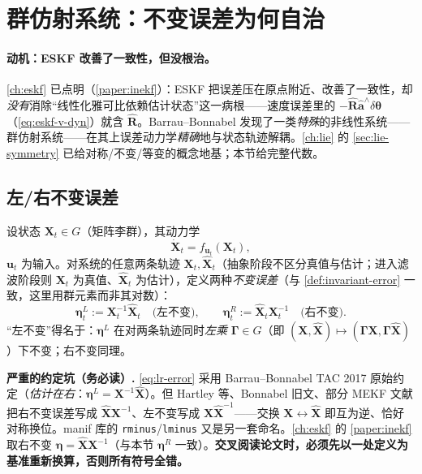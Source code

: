 \section{群仿射系统：不变误差为何自治}
\label{sec:group-affine}

\paragraph{动机：ESKF 改善了一致性，但没根治。}
\cref{ch:eskf} 已点明（\cref{paper:inekf}）：ESKF 把误差压在原点附近、改善了一致性，却\emph{没有}消除“线性化雅可比依赖估计状态”这一病根——速度误差里的 $-\hat{\mathbf{R}}\hat{\mathbf{a}}^\wedge\delta\boldsymbol{\theta}$（\cref{eq:eskf-v-dyn}）就含 $\hat{\mathbf{R}}$。Barrau--Bonnabel\cite{barrau2017invariant} 发现了一类\emph{特殊}的非线性系统——群仿射系统——在其上误差动力学\emph{精确}地与状态轨迹解耦。\cref{ch:lie} 的 \cref{sec:lie-symmetry} 已给对称/不变/等变的概念地基；本节给完整代数。

\subsection{左/右不变误差}
\label{subsec:invariant-error}

设状态 $\mathbf{X}_t\in G$（矩阵李群），其动力学
\begin{equation}
  \dot{\mathbf{X}}_t=f_{\mathbf{u}_t}(\mathbf{X}_t),
  \label{eq:ga-dynamics}
\end{equation}
$\mathbf{u}_t$ 为输入。对系统的任意两条轨迹 $\mathbf{X}_t,\hat{\mathbf{X}}_t$（抽象阶段不区分真值与估计；进入滤波阶段则 $\mathbf{X}_t$ 为真值、$\hat{\mathbf{X}}_t$ 为估计），定义两种\emph{不变误差}（与 \cref{def:invariant-error} 一致，这里用群元素而非其对数）：
\begin{equation}
  \boldsymbol{\eta}^L_t:=\mathbf{X}_t^{-1}\hat{\mathbf{X}}_t\quad\text{(左不变)},\qquad
  \boldsymbol{\eta}^R_t:=\hat{\mathbf{X}}_t\mathbf{X}_t^{-1}\quad\text{(右不变)}.
  \label{eq:lr-error}
\end{equation}
“左不变”得名于：$\boldsymbol{\eta}^L$ 在对两条轨迹同时\emph{左乘} $\boldsymbol{\Gamma}\in G$（即 $(\mathbf{X},\hat{\mathbf{X}})\mapsto(\boldsymbol{\Gamma}\mathbf{X},\boldsymbol{\Gamma}\hat{\mathbf{X}})$）下不变；右不变同理。

\begin{note}
\textbf{严重的约定坑（务必读）.}\;
\cref{eq:lr-error} 采用 Barrau--Bonnabel TAC 2017 原始约定（\emph{估计在右}：$\boldsymbol{\eta}^L=\mathbf{X}^{-1}\hat{\mathbf{X}}$）。但 Hartley 等\cite{hartley2020contact}、Bonnabel 旧文、部分 MEKF 文献把右不变误差写成 $\hat{\mathbf{X}}\mathbf{X}^{-1}$、左不变写成 $\mathbf{X}\hat{\mathbf{X}}^{-1}$——交换 $\mathbf{X}\leftrightarrow\hat{\mathbf{X}}$ 即互为逆、恰好对称换位。manif 库的 \texttt{rminus}/\texttt{lminus} 又是另一套命名。\cref{ch:eskf} 的 \cref{paper:inekf} 取右不变 $\boldsymbol{\eta}=\hat{\mathbf{X}}\mathbf{X}^{-1}$（与本节 $\boldsymbol{\eta}^R$ 一致）。\textbf{交叉阅读论文时，必须先以一处定义为基准重新换算，否则所有符号全错。}
\end{note}

